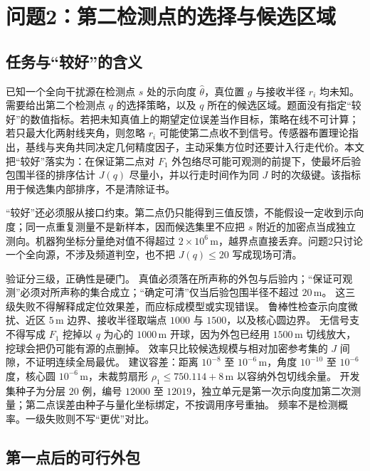 \section{问题2：第二检测点的选择与候选区域}

\subsection{任务与“较好”的含义}

已知一个全向干扰源在检测点 $s$ 处的示向度 $\hat\theta$，真位置 $g$ 与接收半径 $r_i$ 均未知。需要给出第二个检测点 $q$ 的选择策略，以及 $q$ 所在的候选区域。题面没有指定“较好”的数值指标。若把未知真值上的期望定位误差当作目标，策略在线不可计算；若只最大化两射线夹角，则忽略 $r_i$ 可能使第二点收不到信号。传感器布置理论指出，基线与夹角共同决定几何精度因子，主动采集方位时还要计入行走代价。本文把“较好”落实为：在保证第二点对 $F_1$ 外包络尽可能可观测的前提下，使最坏后验包围半径的排序估计 $J(q)$ 尽量小，并以行走时间作为同 $J$ 时的次级键。该指标用于候选集内部排序，不是清除证书。

“较好”还必须服从接口约束。第二点仍只能得到三值反馈，不能假设一定收到示向度；同一点重复测量不是新样本，因而候选集里不应把 $s$ 附近的加密点当成独立测向。机器狗坐标分量绝对值不得超过 $2\times 10^6\,\mathrm{m}$，越界点直接丢弃。问题2只讨论一个全向源，不涉及频道判空，也不把 $J(q)\le 20$ 写成现场可清。

验证分三级，正确性是硬门。
真值必须落在所声称的外包与后验内；“保证可观测”必须对所声称的集合成立；“确定可清”仅当后验包围半径不超过 $20\,\mathrm{m}$。
这三级失败不得解释成定位效果差，而应标成模型或实现错误。
鲁棒性检查示向度微扰、近区 $5\,\mathrm{m}$ 边界、接收半径取端点 $1000$ 与 $1500$，以及核心圆边界。
无信号支不得写成 $F_1$ 挖掉以 $q$ 为心的 $1000\,\mathrm{m}$ 开球，因为外包已经用 $1500\,\mathrm{m}$ 切线放大，挖球会把仍可能有源的点删掉。
效率只比较候选规模与相对加密参考集的 $J$ 间隙，不证明连续全局最优。
建议容差：距离 $10^{-8}$ 至 $10^{-6}\,\mathrm{m}$，角度 $10^{-10}$ 至 $10^{-6}$ 度，核心圆 $10^{-6}\,\mathrm{m}$，未裁剪扇形 $\rho_1\le 750.114+8\,\mathrm{m}$ 以容纳外包切线余量。
开发集种子为分层 $20$ 例，编号 $12000$ 至 $12019$，独立单元是第一次示向度加第二次测量；第二点误差由种子与量化坐标绑定，不按调用序号重抽。
频率不是检测概率。一级失败则不写“更优”对比。

\subsection{第一点后的可行外包}


